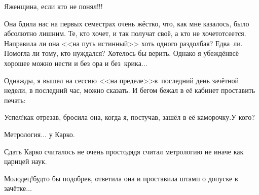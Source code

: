 \diagdash Я\mdash женщина, если кто не понял!!! 

Она бдила нас на первых семестрах очень жёстко, что, как мне казалось, было абсолютно лишним. Те, кто хочет, и так получат своё, а кто не хочет\mdash отсеется. Направила ли она <<на путь истинный>> хоть одного раздолбая? Едва~ли. Помогла ли тому, кто нуждался? Хотелось бы верить. Однако я убеждён\mdash всё хорошее можно нести и без ора и без~крика$\ldots$

Однажды, я вышел на сессию <<на пределе>>\mdash в~последний день зачётной недели, в последний час, можно сказать. И бегом бежал в её кабинет проставить печать:

\diagdash Успел!\mdash как отрезав, бросила она, когда я, постучав, зашёл в её каморочку.\mdash У кого?

\diagdash Метрология$\ldots$ у Кар\sdash ко.

Сдать Кар\sdash ко считалось не очень просто\mdash дядя считал метрологию не иначе как царицей наук.

\diagdash Молодец!\mdash будто бы подобрев, ответила она и проставила штамп о допуске в зачётке$\ldots$

\begin{center}
\end{center}